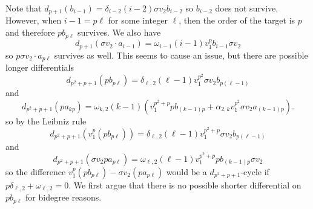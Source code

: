Note that $d_{p+1}(b_{i-1})=\delta_{i-2}(i-2)\sigma v_2 b_{i-2}$ so $b_{i-2}$ does not survive. However, when $i-1=p\ell$ for some integer $\ell$, then the order of the target is $p$ and therefore $pb_{p\ell}$ survives. We also have 
\[ d_{p+1}(\sigma v_2\cdot a_{i-1})= \omega_{i-1}(i-1)v_1^pb_{i-1}\sigma v_2\]
so $p\sigma v_2\cdot a_{p\ell}$ survives as well. This seems to cause an issue, but %
there are possible longer differentials 
\[ 
	d_{p^2+p+1}(pb_{p\ell})=\delta_{\ell,2}(\ell-1) v_1^{p^2}\sigma v_2b_{p(\ell-1)}
\]
and 
\[
	d_{p^2+p+1}(pa_{kp}) = \omega_{k,2} (k-1)\left ( v_1^{p^2+p} pb_{(k-1)p}+\alpha_{2,k}v_1^{p^2}\sigma v_2a_{(k-1)p}\right ).
\]
so by the Leibniz rule
\[ 
	d_{p^2+p+1}(v_1^p(pb_{p\ell}))=\delta_{\ell,2}(\ell-1) v_1^{p^2+p}\sigma v_2b_{p(\ell-1)}
\]
and 
\[
	d_{p^2+p+1}(\sigma v_2 pa_{p\ell}) = \omega_{\ell,2} (\ell-1) v_1^{p^2+p} pb_{(k-1)p}\sigma v_2
\]
so the difference $v_1^p(pb_{p\ell})-\sigma v_2 (pa_{p\ell})$ would be a $d_{p^2+p+1}$-cycle if $p\delta_{\ell,2}+\omega_{\ell,2}=0$. We first argue that there is no possible shorter differential on $pb_{p\ell}$ for bidegree reasons. 

